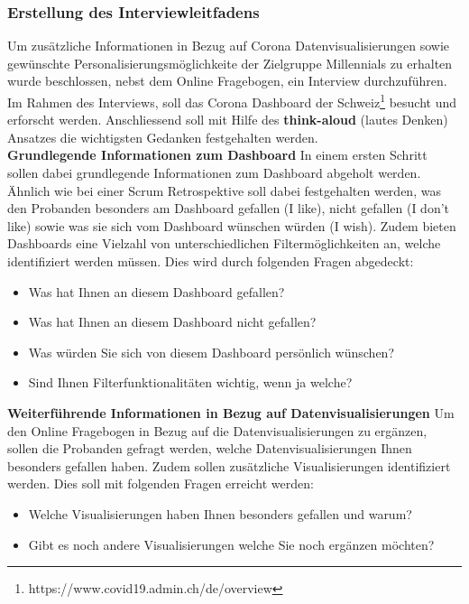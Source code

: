 \subsubsection{Erstellung des Interviewleitfadens} \label{ch:creation_of_interview_guide}
Um zusätzliche Informationen in Bezug auf Corona Datenvisualisierungen sowie gewünschte Personalisierungsmöglichkeite der Zielgruppe Millennials zu erhalten wurde beschlossen, nebst dem Online Fragebogen, ein Interview durchzuführen.
Im Rahmen des Interviews, soll das Corona Dashboard der Schweiz\footnote{https://www.covid19.admin.ch/de/overview} besucht und erforscht werden. Anschliessend soll mit Hilfe des \textbf{think-aloud} (lautes Denken) Ansatzes die wichtigsten Gedanken festgehalten werden.\\

\noindent
\textbf{Grundlegende Informationen zum Dashboard}
\newline
\indent
In einem ersten Schritt sollen dabei grundlegende Informationen zum Dashboard abgeholt werden. Ähnlich wie bei einer Scrum Retrospektive soll dabei festgehalten werden, was den Probanden besonders am Dashboard gefallen (I like), nicht gefallen (I don't like) sowie was sie sich vom Dashboard wünschen würden (I wish). Zudem bieten Dashboards eine Vielzahl von  unterschiedlichen Filtermöglichkeiten an, welche identifiziert werden müssen. Dies wird durch folgenden Fragen abgedeckt:
\begin{itemize}
    \item Was hat Ihnen an diesem Dashboard gefallen?
    \item Was hat Ihnen an diesem Dashboard nicht gefallen?
    \item Was würden Sie sich von diesem Dashboard persönlich wünschen?
    \item Sind Ihnen Filterfunktionalitäten wichtig, wenn ja welche?
\end{itemize}

\clearpage
\noindent
\textbf{Weiterführende Informationen in Bezug auf Datenvisualisierungen}
\newline
\indent
Um den Online Fragebogen in Bezug auf die Datenvisualisierungen zu ergänzen, sollen die Probanden gefragt werden, welche Datenvisualisierungen Ihnen besonders gefallen haben. Zudem sollen zusätzliche Visualisierungen identifiziert werden. Dies soll mit folgenden Fragen erreicht werden:
\begin{itemize}
    \item Welche Visualisierungen haben Ihnen besonders gefallen und warum?
    \item Gibt es noch andere Visualisierungen welche Sie noch ergänzen möchten?
\end{itemize}

